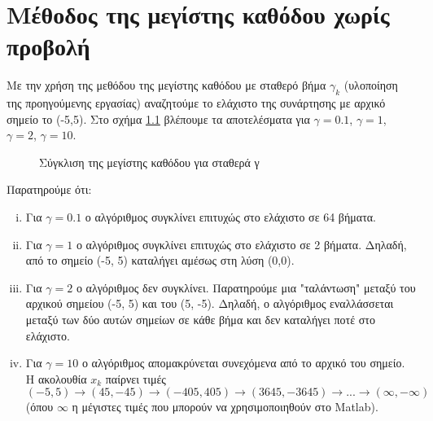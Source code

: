 \chapter{Μέθοδος της μεγίστης καθόδου χωρίς προβολή}

Με την χρήση της μεθόδου της μεγίστης καθόδου με σταθερό βήμα $\gamma_k$ (υλοποίηση της προηγούμενης εργασίας) 
αναζητούμε το ελάχιστο της συνάρτησης με αρχικό σημείο το (-5,5).
Στο σχήμα \ref{fig:stepeest_plots} βλέπουμε τα αποτελέσματα για $\gamma = 0.1$, $\gamma = 1$, $\gamma = 2$, $\gamma = 10$.

\begin{figure}[hbtp]
	\centering
	\setlength\figureheight{\textwidth}
	\setlength\figurewidth{\textwidth}
%	
	\caption{Σύγκλιση της μεγίστης καθόδου για σταθερά γ}
	\label{fig:stepeest_plots}
\end{figure}

\noindent \begin{minipage}{\linewidth}
\noindent Παρατηρούμε ότι:
\begin{enumerate}[i)]
	\item Για $\gamma = 0.1$ ο αλγόριθμος συγκλίνει επιτυχώς στο ελάχιστο σε 64 βήματα.
	\item Για $\gamma = 1$ ο αλγόριθμος συγκλίνει επιτυχώς στο ελάχιστο σε 2 βήματα. Δηλαδή, από το σημείο (-5, 5) καταλήγει αμέσως στη λύση (0,0).
	\item Για $\gamma = 2$ ο αλγόριθμος δεν συγκλίνει. Παρατηρούμε μια "ταλάντωση" μεταξύ του αρχικού σημείου (-5, 5) και του (5, -5). Δηλαδή, ο αλγόριθμος εναλλάσσεται μεταξύ των δύο αυτών σημείων σε κάθε βήμα και δεν καταλήγει ποτέ στο ελάχιστο.
	\item Για $\gamma = 10$ ο αλγόριθμος απομακρύνεται συνεχόμενα από το αρχικό του σημείο. Η ακολουθία $x_k$ παίρνει τιμές $(-5, 5) \rightarrow (45, -45) \rightarrow (-405, 405) \rightarrow (3645, -3645) \rightarrow ... \rightarrow (\infty, -\infty)$ (όπου $\infty$ η μέγιστες τιμές που μπορούν να χρησιμοποιηθούν στο Matlab).
\end{enumerate}
\end{minipage}

